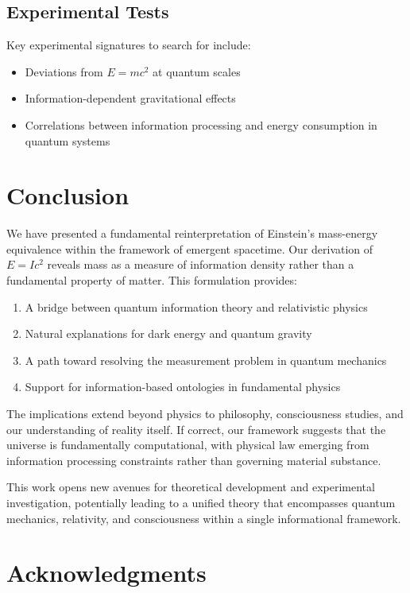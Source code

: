 \documentclass[12pt]{article}
\begin{document}
\subsection{Experimental Tests}

Key experimental signatures to search for include:

\begin{itemize}
\item Deviations from $E = mc^2$ at quantum scales
\item Information-dependent gravitational effects
\item Correlations between information processing and energy consumption in quantum systems
\end{itemize}

\section{Conclusion}

We have presented a fundamental reinterpretation of Einstein's mass-energy equivalence within the framework of emergent spacetime. Our derivation of $E = Ic^2$ reveals mass as a measure of information density rather than a fundamental property of matter. This formulation provides:

\begin{enumerate}
\item A bridge between quantum information theory and relativistic physics
\item Natural explanations for dark energy and quantum gravity
\item A path toward resolving the measurement problem in quantum mechanics
\item Support for information-based ontologies in fundamental physics
\end{enumerate}

The implications extend beyond physics to philosophy, consciousness studies, and our understanding of reality itself. If correct, our framework suggests that the universe is fundamentally computational, with physical law emerging from information processing constraints rather than governing material substance.

This work opens new avenues for theoretical development and experimental investigation, potentially leading to a unified theory that encompasses quantum mechanics, relativity, and consciousness within a single informational framework.

\section*{Acknowledgments}
\end{document}
